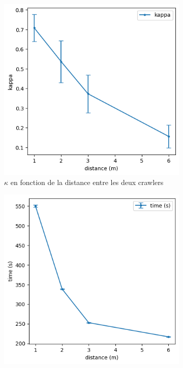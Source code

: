 \documentclass[francais,RandD]{rapportPFE}
\begin{document}
			\begin{figure}[h!]
				\begin{subfigure}[t]{0.49\linewidth}
					\includegraphics[width=\linewidth]{graphics/peinture_au_rouleau-kappa_vs_distance.png}
					\caption{$\kappa$ en fonction de la distance entre les deux crawlers}
					\label{fig:peinture_au_rouleau-kappa_vs_distance}
				\end{subfigure}
				\hfill
				\begin{subfigure}[t]{0.49\linewidth}
						\includegraphics[width=\linewidth]{graphics/peinture_au_rouleau-time_vs_distance.png}

\end{subfigure}
\end{figure}
\end{document}
